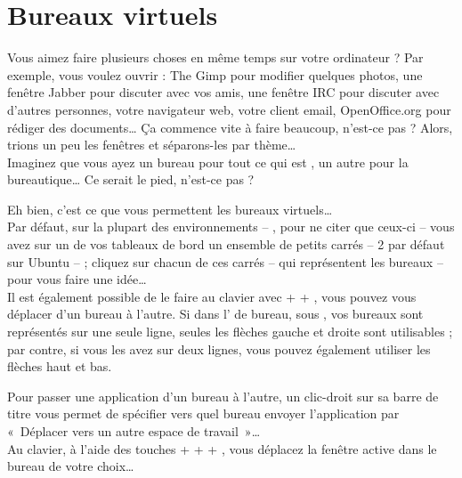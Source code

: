 \section{Bureaux virtuels}
\label{RefBureauxVirtuels}
Vous aimez faire plusieurs choses en même temps sur votre ordinateur ? Par exemple, vous voulez ouvrir : The Gimp pour modifier quelques photos, une fenêtre Jabber pour discuter avec vos amis, une fenêtre IRC pour discuter avec d'autres personnes, votre navigateur web, votre client email, OpenOffice.org pour rédiger des documents\ldots{} Ça commence vite à faire beaucoup, n'est-ce pas ?
Alors, trions un peu les fenêtres et séparons-les par thème\ldots{}\\
Imaginez que vous ayez un bureau pour tout ce qui est , un autre pour la bureautique… Ce serait le pied, n'est-ce pas ?\par
Eh bien, c'est ce que vous permettent les bureaux virtuels…\\
Par défaut, sur la plupart des environnements -- ,  pour ne citer que ceux-ci -- vous avez sur un de vos tableaux de bord un ensemble de petits carrés -- 2 par défaut sur Ubuntu -- ; cliquez sur chacun de ces carrés -- qui représentent les bureaux -- pour vous faire une idée…\\
Il est également possible de le faire au clavier  avec  +  + , vous pouvez vous déplacer d'un bureau à l'autre.
Si dans l' de bureau, sous , vos bureaux sont représentés sur une seule ligne, seules les flèches gauche et droite sont utilisables ; par contre, si vous les avez sur deux lignes, vous pouvez également utiliser les flèches haut et bas.\par
Pour passer une application d'un bureau à l'autre, un clic-droit sur sa barre de titre vous permet de spécifier vers quel bureau envoyer l'application par «~Déplacer vers un autre espace de travail~»\ldots{}\\
Au clavier, à l'aide des touches  +  +  + , vous déplacez la fenêtre active dans le bureau de votre choix\ldots{}
